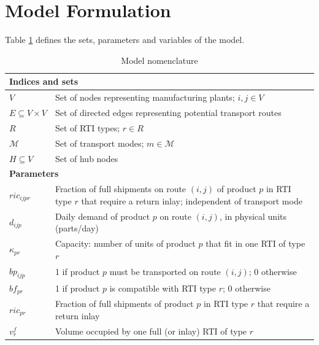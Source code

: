\section{Model Formulation}

Table \ref{tab:nomenclature} defines the sets, parameters and variables of the model.


\begin{longtable}{|p{}|p{}|}
\caption{Model nomenclature}
\label{tab:nomenclature}\\
\hline
\multicolumn{2}{|l|}{\textbf{Indices and sets}}\\ \hline
$V$
  & Set of nodes representing manufacturing plants; $i,j\in V$ \\
$E\subseteq V\times V$
  & Set of directed edges representing potential transport routes \\
$R$
  & Set of RTI types; $r\in R$ \\
$\mathcal{M}$
  & Set of transport modes; $m\in\mathcal{M}$ \\
$H\subseteq V$
  & Set of hub nodes \\ \hline
\multicolumn{2}{|l|}{\textbf{Parameters}}\\ \hline
$ric_{ijpr}$
  & Fraction of full shipments on route $(i,j)$ of product $p$ in
    RTI type $r$ that require a return inlay; independent of
    transport mode \\
$d_{ijp}$        & Daily demand of product $p$ on route $(i,j)$, in physical units (parts/day) \\
$\kappa_{pr}$    & Capacity: number of units of product $p$ that fit in one RTI of type $r$ \\
$bp_{ijp}$       & 1 if product $p$ must be transported on route $(i,j)$; 0 otherwise \\
$bf_{pr}$        & 1 if product $p$ is compatible with RTI type $r$; 0 otherwise \\
$ric_{pr}$       & Fraction of full shipments of product $p$ in RTI type $r$ that require a return inlay \\
$v^{f}_{r}$      & Volume occupied by one full (or inlay) RTI of type $r$ \\

\end{longtable}
